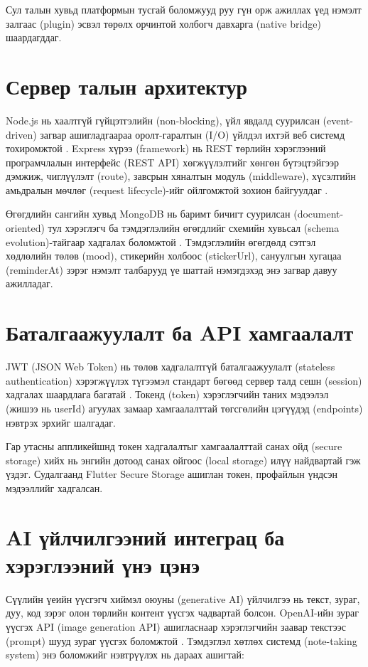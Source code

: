 Сул талын хувьд платформын тусгай боломжууд руу гүн орж ажиллах үед нэмэлт залгаас (plugin) эсвэл төрөлх орчинтой холбогч давхарга (native bridge) шаардагддаг.

\section{Сервер талын архитектур}

Node.js нь хаалтгүй гүйцэтгэлийн (non-blocking), үйл явдалд суурилсан (event-driven) загвар ашигладгаараа оролт-гаралтын (I/O) үйлдэл ихтэй веб системд тохиромжтой \cite{nodejs_docs}. Express хүрээ (framework) нь REST төрлийн хэрэглээний програмчлалын интерфейс (REST API) хөгжүүлэлтийг хөнгөн бүтэцтэйгээр дэмжиж, чиглүүлэлт (route), завсрын хяналтын модуль (middleware), хүсэлтийн амьдралын мөчлөг (request lifecycle)-ийг ойлгомжтой зохион байгуулдаг \cite{express_docs}.

Өгөгдлийн сангийн хувьд MongoDB нь баримт бичигт суурилсан (document-oriented) тул хэрэглэгч ба тэмдэглэлийн өгөгдлийг схемийн хувьсал (schema evolution)-тайгаар хадгалах боломжтой \cite{mongodb_docs}. Тэмдэглэлийн өгөгдөлд сэтгэл хөдлөлийн төлөв (mood), стикерийн холбоос (stickerUrl), сануулгын хугацаа (reminderAt) зэрэг нэмэлт талбарууд үе шаттай нэмэгдэхэд энэ загвар давуу ажилладаг.

\section{Баталгаажуулалт ба API хамгаалалт}

JWT (JSON Web Token) нь төлөв хадгалалтгүй баталгаажуулалт (stateless authentication) хэрэгжүүлэх түгээмэл стандарт бөгөөд сервер талд сешн (session) хадгалах шаардлага багатай \cite{jwt_rfc}. Токенд (token) хэрэглэгчийн таних мэдээлэл (жишээ нь userId) агуулах замаар хамгаалалттай төгсгөлийн цэгүүдэд (endpoints) нэвтрэх эрхийг шалгадаг.

Гар утасны аппликейшнд токен хадгалалтыг хамгаалалттай санах ойд (secure storage) хийх нь энгийн дотоод санах ойгоос (local storage) илүү найдвартай гэж үздэг. Судалгаанд Flutter Secure Storage ашиглан токен, профайлын үндсэн мэдээллийг хадгалсан.

\section{AI үйлчилгээний интеграц ба хэрэглээний үнэ цэнэ}

Сүүлийн үеийн үүсгэгч хиймэл оюуны (generative AI) үйлчилгээ нь текст, зураг, дуу, код зэрэг олон төрлийн контент үүсгэх чадвартай болсон. OpenAI-ийн зураг үүсгэх API (image generation API) ашигласнаар хэрэглэгчийн заавар текстээс (prompt) шууд зураг үүсгэх боломжтой \cite{openai_images}. Тэмдэглэл хөтлөх системд (note-taking system) энэ боломжийг нэвтрүүлэх нь дараах ашигтай:

